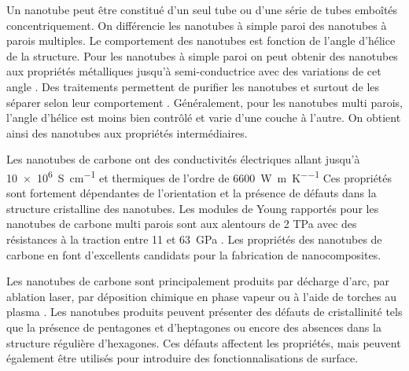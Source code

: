 Un nanotube peut être constitué d'un seul tube ou d'une série de tubes emboîtés concentriquement. 
On différencie les nanotubes à simple paroi des nanotubes à parois multiples. 
Le comportement des nanotubes est fonction de l'angle d'hélice de la structure. 
Pour les nanotubes à simple paroi on peut obtenir des nanotubes aux propriétés métalliques jusqu'à semi-conductrice avec des variations de cet angle \cite{Saito1992}. 
Des traitements permettent de purifier les nanotubes et surtout de les séparer selon leur comportement \cite{Makama2013}. 
Généralement, pour les nanotubes multi parois, l'angle d'hélice est moins bien contrôlé et varie d'une couche à l'autre.
On obtient ainsi des nanotubes aux propriétés intermédiaires. 

Les nanotubes de carbone ont des conductivités électriques allant jusqu'à \SI{10e6}{\siemens\per\centi\metre}  \cite{Sathyanarayana2013} et thermiques de l'ordre de \SI{6600}{\watt\per\metre\per\kelvin} \cite{Berber2000}
Ces propriétés sont fortement dépendantes de l'orientation et la présence de défauts dans la structure cristalline des nanotubes. 
Les modules de Young rapportés pour les nanotubes de carbone multi parois sont aux alentours de 2 TPa avec des résistances à la traction entre 11 et \SI{63}{\giga\pascal} \cite{Mittal2014h}. 
Les propriétés des nanotubes de carbone en font d'excellents candidats pour la fabrication de nanocomposites.

Les nanotubes de carbone sont principalement produits par décharge d'arc, par ablation laser, par déposition chimique en phase vapeur \cite{Sathyanarayana2013} ou à l'aide de torches au plasma \cite{Kim2009e}. 
Les nanotubes produits peuvent présenter des défauts de cristallinité tels que la présence de pentagones et d'heptagones ou encore des absences dans la structure régulière d'hexagones. 
Ces défauts affectent les propriétés, mais peuvent également être utilisés pour introduire des fonctionnalisations de surface. 

